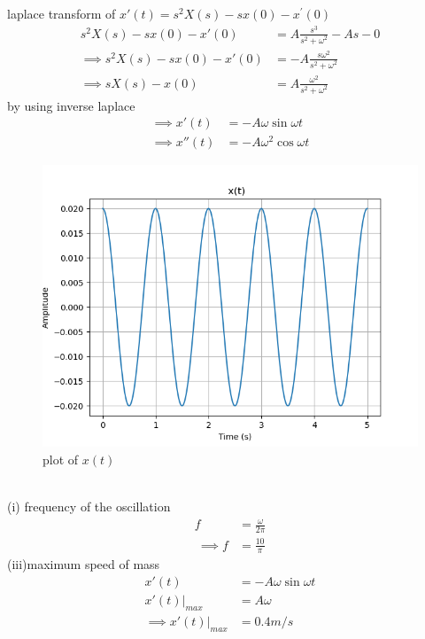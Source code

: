 \documentclass[journal,12pt,twocolumn]{IEEEtran}
\theoremstyle{remark}
\begin{document}
laplace transform of  $x'(t)=s^2X(s)-sx(0)-x^{'}(0)$
\begin{align}
s^2X(s)-sx(0)-x'(0)&=A\frac{s^3}{s^2+\omega^2}-As-0\\
\implies s^2X(s)-sx(0)-x'(0)&=-A\frac{s\omega^2}{s^2+\omega^2}\\
\implies sX(s)-x(0)&=A\frac{\omega^2}{s^2+\omega^2}
\end{align}
by using inverse laplace
\begin{align}
\implies x'(t)&=-A\omega\sin{\omega t}\\
\implies x''(t)&=-A\omega^2 \cos{\omega t}
\end{align}
\begin{figure}[h!]
    \centering
    \includegraphics[width=1.1\linewidth]{figs/analog1.png}
    \caption{plot of $x(t)$}
\end{figure}\\
(i) frequency of the oscillation
\begin{align}
    f&=\frac{\omega}{2\pi}\\\
    \implies f&=\frac{10}{\pi}
\end{align}
(iii)maximum speed of mass\\
\begin{align}
    x'(t)&=-A\omega\sin{\omega t}\\
  x'(t)\Bigr|_{max}&=A\omega\\
    \implies x'(t)\Bigr|_{max} &= 0.4 m/s
\end{align}
\end{document}
